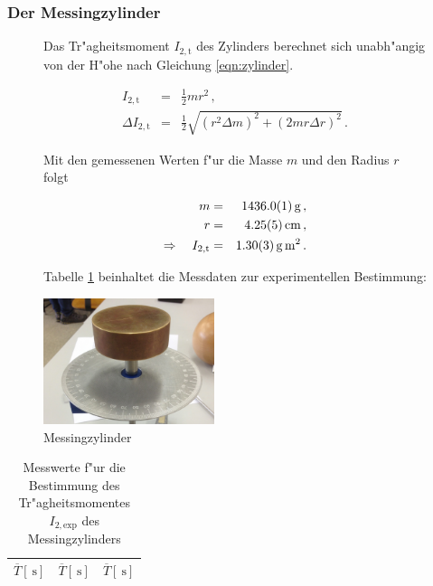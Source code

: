 			\subsubsection{Der Messingzylinder}
			\label{subsubsec:holzkugel}
				\begin{figure}[htbp]
					\begin{minipage}[t]{8cm}
						\vspace{0pt}
						Das Tr"agheitsmoment $I_\mathrm{2, t}$ des Zylinders berechnet sich unabh"angig von der H"ohe nach Gleichung \eqref{eqn:zylinder}.

						\begin{eqnarray}
							I_\mathrm{2, t} & = & \frac{1}{2}mr^2 \,, \label{eqn:zylinder} \\
							\Delta I_\mathrm{2, t} & = & \frac{1}{2} \sqrt{ \left(r^2 \Delta m\right)^2 + \left( 2 mr \Delta r\right)^2} \,. \nonumber
						\end{eqnarray}

						Mit den gemessenen Werten f"ur die Masse $m$ und den Radius $r$ folgt

						\begin{eqnarray*}
							m & = & \SI{1436.0 (1)}{\gram} \,, \\
							r & = & \SI{4.25 (5)}{\centi \meter} \,, \\
							\Rightarrow \quad I_\mathrm{2, t} & = & \SI{1.30 (3)}{\gram \meter \squared} \,.
						\end{eqnarray*}

						Tabelle \ref{tabelle:messingzylinder} beinhaltet die Messdaten zur experimentellen Bestimmung:
					\end{minipage}
					\hfill
					\begin{minipage}[t]{5cm}
						\vspace{0pt}
						\centering
						\includegraphics[width = 5cm]{img/messing.jpg}
						\caption{Messingzylinder}
						\label{fig:zylinder}
					\end{minipage}
				\end{figure}

				\begin{table}[h!]
					\begin{center}
						\caption{Messwerte f"ur die Bestimmung des Tr"agheitsmomentes $I_\mathrm{2, exp}$ des Messingzylinders \label{tabelle:messingzylinder}}
						\begin{tabular}{|c||c||c|}
							\hline
							$\overline{T} [\SI{}{\second}]$ & $\overline{T} [\SI{}{\second}]$ & $\overline{T} [\SI{}{\second}]$ \\
							\hline 
							\hline
							
							\hline 
						\end{tabular}
					\end{center}
				\end{table}

